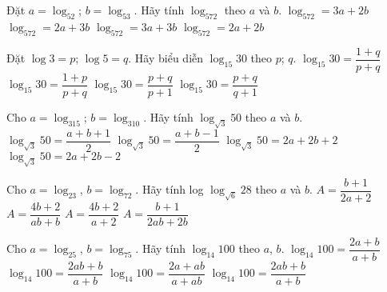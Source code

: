 \begin{ex}%
	Đặt $a=\log_52$; $b=\log_53$. Hãy tính $\log_572$ theo $a$ và $b$.
	\choice
	{\True $\log_572=3a+2b$}
	{$\log_572=2a+3b$}
	{$\log_572=3a+3b$}
	{$\log_572=2a+2b$}
\end{ex}

\begin{ex}%
	Đặt $\log 3=p$; $\log 5=q$. Hãy biểu diễn $\log_{15}30$ theo $p$; $q$. 
	\choice
	{$\log_{15}30=\dfrac{1+q}{p+q}$}
	{\True $\log_{15}30=\dfrac{1+p}{p+q}$}
	{$\log_{15}30=\dfrac{p+q}{p+1}$}
	{$\log_{15}30=\dfrac{p+q}{q+1}$}
\end{ex}

\begin{ex}%
	Cho $a=\log_315$; $b=\log_310$. Hãy tính $\log_{\sqrt{3}}50$ theo $a$ và $b$.
	\choice
	{$\log_{\sqrt{3}}50=\dfrac{a+b+1}{2}$}
	{$\log_{\sqrt{3}}50=\dfrac{a+b-1}{2}$}
	{$\log_{\sqrt{3}}50=2a+2b+2$}
	{\True $\log_{\sqrt{3}}50=2a+2b-2$}
\end{ex}

\begin{ex}%
	Cho $a=\log_23$, $b=\log_72$. Hãy tính log $\log_{\sqrt{6}}28$ theo $a$ và $b$.
	\choice
	{$A=\dfrac{b+1}{2a+2}$}
	{\True $A=\dfrac{4b+2}{ab+b}$}
	{$A=\dfrac{4b+2}{a+2}$}
	{$A=\dfrac{b+1}{2ab+2b}$}
\end{ex}

\begin{ex}%
	Cho $a=\log_25$, $b=\log_75$. Hãy tính $\log_{14}100$ theo $a$, $b$. 
	\choice
	{$\log_{14}100=\dfrac{2a+b}{a+b}$}
	{$\log_{14}100=\dfrac{2ab+b}{a+b}$}
	{$\log_{14}100=\dfrac{2a+ab}{a+ab}$}
	{\True $\log_{14}100=\dfrac{2ab+b}{a+b}$}
\end{ex}

